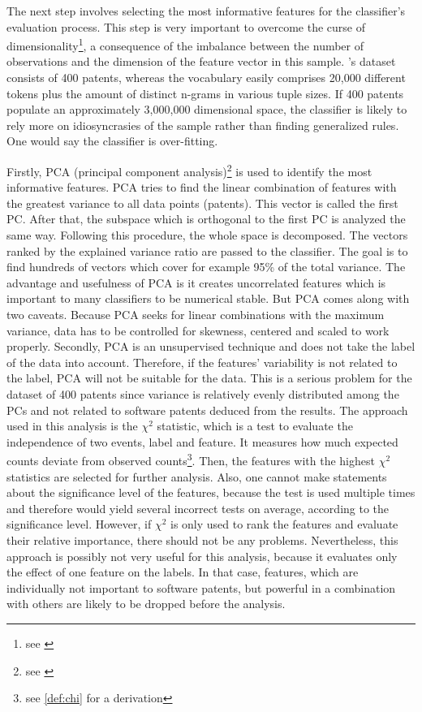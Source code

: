 \documentclass[12pt, a4paper, abstract, parskip]{scrartcl}
\theoremstyle{definition}
\begin{document}
The next step involves selecting the most informative features for the
classifier's evaluation process. This step is very important to overcome the
curse of dimensionality\footnote{see \cite{kulkarni2011elementary}}, a
consequence of the imbalance between the number of observations and the
dimension of the feature vector in this sample.
\citeauthor{bessen2007empirical}'s dataset consists of 400 patents, whereas the
vocabulary easily comprises 20,000 different tokens plus the amount of distinct
n-grams in various tuple sizes. If 400 patents populate an approximately
3,000,000 dimensional space, the classifier is likely to rely more on
idiosyncrasies of the sample rather than finding generalized rules. One would
say the classifier is over-fitting.

Firstly, PCA (principal component analysis)\footnote{see
\cite{kuhn2013applied}} is used to identify the most informative features. PCA
tries to find the linear combination of features with the greatest variance to
all data points (patents). This vector is called the first PC. After that, the
subspace which is orthogonal to the first PC is analyzed the same way.
Following this procedure, the whole space is decomposed. The vectors ranked by
the explained variance ratio are passed to the classifier. The goal is to find
hundreds of vectors which cover for example 95\% of the total variance. The
advantage and usefulness of PCA is it creates uncorrelated features which is
important to many classifiers to be numerical stable. But PCA comes along with
two caveats. Because PCA seeks for linear combinations with the maximum
variance, data has to be controlled for skewness, centered and scaled to work
properly. Secondly, PCA is an unsupervised technique and does not take the
label of the data into account. Therefore, if the features' variability is not
related to the label, PCA will not be suitable for the data. This is a serious
problem for the dataset of 400 patents since variance is relatively evenly
distributed among the PCs and not related to software patents deduced from the
results. The approach used in this analysis is the $\chi^2$ statistic, which is
a test to evaluate the independence of two events, label and feature. It
measures how much expected counts deviate from observed counts\footnote{see
\ref{def:chi} for a derivation}. Then, the features with the highest $\chi^2$
statistics are selected for further analysis. Also, one cannot make statements
about the significance level of the features, because the test is used multiple
times and therefore would yield several incorrect tests on average, according
to the significance level. However, if $\chi^2$ is only used to rank the
features and evaluate their relative importance, there should not be any
problems. Nevertheless, this approach is possibly not very useful for this
analysis, because it evaluates only the effect of one feature on the labels. In
that case, features, which are individually not important to software patents,
but powerful in a combination with others are likely to be dropped before the
analysis.
\end{document}

